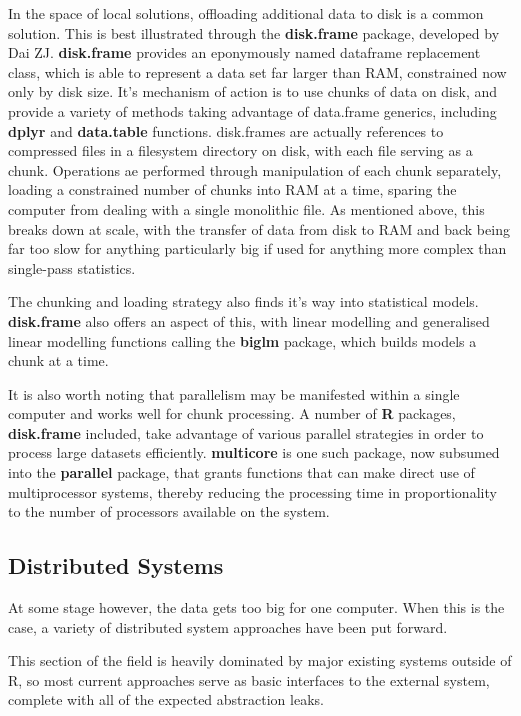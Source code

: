 In the space of local solutions, offloading additional data to disk is a common solution.
This is best illustrated through the \textbf{disk.frame} package, developed by Dai ZJ.
\textbf{disk.frame} provides an eponymously named dataframe replacement class, which is able to represent a data  set far larger than RAM, constrained now only by disk size\cite{zj20}.
It's mechanism of action is to use chunks of data on disk, and provide a variety of methods taking advantage of data.frame generics, including \textbf{dplyr} and \textbf{data.table} functions.
disk.frames are actually references to compressed files in a filesystem directory on disk, with each file serving as a chunk.
Operations ae performed through manipulation of each chunk separately, loading a constrained number of chunks into RAM at a time, sparing the computer from dealing with a single monolithic file\cite{zj19:_inges_data}.
As mentioned above, this breaks down at scale, with the transfer of data from disk to RAM and back being far too slow for anything particularly big if used for anything more complex than single-pass statistics.

The chunking and loading strategy also finds it's way into statistical models.
\textbf{disk.frame} also offers an aspect of this, with linear modelling and generalised linear modelling functions calling the \textbf{biglm} package, which builds models a chunk at a time\cite{lumley13}.

It is also worth noting that parallelism may be manifested within a single computer and works well for chunk processing.
A number of \textbf{R} packages, \textbf{disk.frame} included, take advantage of various parallel strategies in order to process large datasets efficiently.
\textbf{multicore} is one such package, now subsumed into the \textbf{parallel} package, that grants functions that can make direct use of multiprocessor systems, thereby reducing the processing time in proportionality to the number of processors available on the system\cite{team20:_r}.

\subsection{Distributed Systems}

At some stage however, the data gets too big for one computer.
When this is the case, a variety of distributed system approaches have been put forward.

This section of the field is heavily dominated by major existing systems outside of R, so most current approaches serve as basic interfaces to the external system, complete with all of the expected abstraction leaks\cite{spolsky2002abstraction}.

